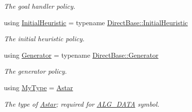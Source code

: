 \begin{DoxyCompactItemize}
\begin{DoxyCompactList}\small\item\em The goal handler policy. \end{DoxyCompactList}\item 
using \hyperlink{structAstar_af21d7678a4859a9f078253be94e34d6e}{Initial\+Heuristic} = typename \hyperlink{structAlgorithm_a01a7b5d204e82e4aed951680a38013a5}{Direct\+Base\+::\+Initial\+Heuristic}\hypertarget{structAstar_af21d7678a4859a9f078253be94e34d6e}{}\label{structAstar_af21d7678a4859a9f078253be94e34d6e}

\begin{DoxyCompactList}\small\item\em The initial heuristic policy. \end{DoxyCompactList}\item 
using \hyperlink{structAstar_a08c3b39a822ab66a9f1c79844f5ecb6c}{Generator} = typename \hyperlink{structAlgorithm_ae48d359026f66d7f6c0d15d964a0e8bd}{Direct\+Base\+::\+Generator}\hypertarget{structAstar_a08c3b39a822ab66a9f1c79844f5ecb6c}{}\label{structAstar_a08c3b39a822ab66a9f1c79844f5ecb6c}

\begin{DoxyCompactList}\small\item\em The generator policy. \end{DoxyCompactList}\item 
using \hyperlink{structAstar_aaff2d3b0b2aec5a94929b5de17d50aa9}{My\+Type} = \hyperlink{structAstar}{Astar}\hypertarget{structAstar_aaff2d3b0b2aec5a94929b5de17d50aa9}{}\label{structAstar_aaff2d3b0b2aec5a94929b5de17d50aa9}

\begin{DoxyCompactList}\small\item\em The type of \hyperlink{structAstar}{Astar}; required for \hyperlink{algorithm_8h_a64c012078deee9a30405e18ec11e6360}{A\+L\+G\+\_\+\+D\+A\+TA} symbol. \end{DoxyCompactList}\end{DoxyCompactItemize}
